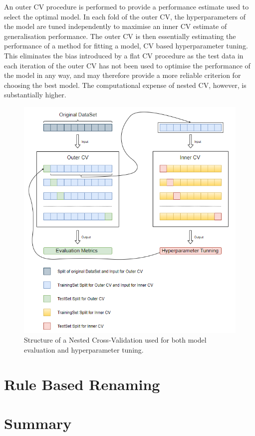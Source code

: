 An outer CV procedure is performed to provide a performance estimate used to select the optimal model. In each fold of the outer CV, the hyperparameters of the model are tuned independently to maximise an inner CV estimate of generalisation performance. The outer CV is then essentially estimating the performance of a method for fitting a model, CV based hyperparameter tuning. This eliminates the bias introduced by a flat CV procedure as the test data in each iteration of the outer CV has not been used to optimise the performance of the model in any way, and may therefore provide a more reliable criterion for choosing the best model. The computational expense of nested CV, however, is substantially higher. \\



\begin{figure}[H]
  \centering
  \includegraphics[scale=0.95]{Images/nested_cv.png}
  \caption{Structure of a Nested Cross-Validation used for both model evaluation and hyperparameter tuning.}
  \label{NestedCV}
\end{figure}

\section{Rule Based Renaming}

\section{Summary}


